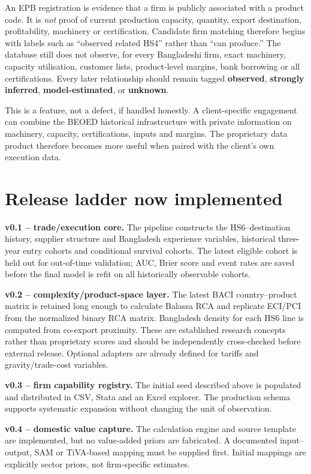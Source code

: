\documentclass[11pt]{article}
\begin{document}
An EPB registration is evidence that a firm is publicly associated with a product code. It is \emph{not} proof of current production capacity, quantity, export destination, profitability, machinery or certification. Candidate firm matching therefore begins with labels such as ``observed related HS4'' rather than ``can produce.'' The database still does not observe, for every Bangladeshi firm, exact machinery, capacity utilisation, customer lists, product-level margins, bank borrowing or all certifications. Every later relationship should remain tagged \textbf{observed}, \textbf{strongly inferred}, \textbf{model-estimated}, or \textbf{unknown}.

This is a feature, not a defect, if handled honestly. A client-specific engagement can combine the BEOED historical infrastructure with private information on machinery, capacity, certifications, inputs and margins. The proprietary data product therefore becomes more useful when paired with the client's own execution data.

\section{Release ladder now implemented}
\textbf{v0.1 -- trade/execution core.} The pipeline constructs the HS6--destination history, supplier structure and Bangladesh experience variables, historical three-year entry cohorts and conditional survival cohorts. The latest eligible cohort is held out for out-of-time validation; AUC, Brier score and event rates are saved before the final model is refit on all historically observable cohorts.

\textbf{v0.2 -- complexity/product-space layer.} The latest BACI country--product matrix is retained long enough to calculate Balassa RCA and replicate ECI/PCI from the normalized binary RCA matrix. Bangladesh density for each HS6 line is computed from co-export proximity. These are established research concepts rather than proprietary scores and should be independently cross-checked before external release. Optional adapters are already defined for tariffs and gravity/trade-cost variables.

\textbf{v0.3 -- firm capability registry.} The initial seed described above is populated and distributed in CSV, Stata and an Excel explorer. The production schema supports systematic expansion without changing the unit of observation.

\textbf{v0.4 -- domestic value capture.} The calculation engine and source template are implemented, but no value-added priors are fabricated. A documented input--output, SAM or TiVA-based mapping must be supplied first. Initial mappings are explicitly sector priors, not firm-specific estimates.
\end{document}
